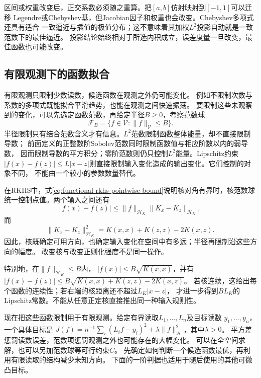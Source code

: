区间或权重改变后，正交系数必须随之重算。把$[a,b]$仿射映射到$[-1,1]$可以迁移
Legendre或Chebyshev基，但Jacobian因子和权重也会改变。Chebyshev多项式还具有适合
一致逼近与插值的极值分布；这不意味着其加权$L^2$投影自动就是一致范数下的最佳逼近。
投影结论始终相对于所选内积成立，误差度量一旦改变，最佳函数也可能改变。

\subsection{有限观测下的函数拟合}
\label{sec:functional-finite-observation-fitting}
\label{sec:functional-class-size-smoothness}


有限观测只限制少数读数，候选函数在观测之外仍可能变化。
例如不限制次数与系数的多项式既能拟合平滑趋势，也能在观测之间快速振荡。
要限制这些未观察到的变化，可以先选定函数范数，再给定半径$B\geq0$，考察范数球
\[
  \mathcal{F}_B
  =
  \{f\in\mathcal{V}:\lVert f\rVert_{\mathcal{V}}\leq B\}.
\]
半径限制只有结合范数含义才有信息。$L^2$范数限制函数整体能量，却不直接限制导数；
前面定义的正整数阶Sobolev范数同时限制函数值与相应阶数以内的弱导数，
因而限制导数的平方积分；零阶范数则仍只控制$L^2$能量。Lipschitz约束
$|f(x)-f(z)|\leq L|x-z|$则直接限制输入变化造成的输出变化。它们控制的对象不同，
不能由一个较小的参数数量替代。

在RKHS中，式\eqref{eq:functional-rkhs-pointwise-bound}说明核对角有界时，核范数球
统一控制点值。两个输入之间还有
\begin{equation}
  |f(x)-f(z)|
  \leq
  \lVert f\rVert_{\mathcal{H}_K}
  \lVert K_x-K_z\rVert_{\mathcal{H}_K},
  \label{eq:functional-rkhs-modulus-bound}
\end{equation}
而
\[
  \lVert K_x-K_z\rVert_{\mathcal{H}_K}^2
  =
  K(x,x)+K(z,z)-2K(x,z).
\]
因此，核既确定可用方向，也确定输入变化在空间中有多远；半径再限制沿这些方向的幅度。
改变核与改变正则化强度不是同一操作。

特别地，在$\lVert f\rVert_{\mathcal H_K}\leq B$内，
$|f(x)|\leq B\sqrt{K(x,x)}$，并有
$|f(x)-f(z)|\leq B\sqrt{K(x,x)+K(z,z)-2K(x,z)}$。
若核连续，这给出每个函数的连续性；若右端的核距离还不超过$L_K|x-z|$，
才进一步得到$BL_K$的Lipschitz常数。不能从任意正定核直接推出同一种输入规则性。

现在把这些函数限制用于有限观测。给定有界读取$L_1,\ldots,L_n$及目标读数
$y_1,\ldots,y_n$，一个具体目标是
$J(f)=n^{-1}\sum_i(L_if-y_i)^2+\lambda\lVert f\rVert_{\mathcal H}^2$，其中$\lambda>0$。
平方差惩罚读数误差，范数项惩罚观测之外也可能存在的大幅变化。
可以在全空间求解，也可以另加范数球等可行约束$C$。
先确定如何判断一个候选函数最优，再利用有限读取的结构减少未知方向。
下面的一阶判据也适用于随后使用的其他可微凸目标。

